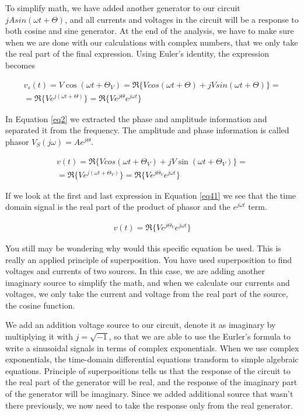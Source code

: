 \documentclass{ximera}
\begin{document}
To simplify math, we have added another generator to our circuit $j A sin (\omega t + \Theta)$, and all currents and voltages in the circuit will be a response to both cosine and sine generator. At the end of the analysis,  we have to make sure when we are done with our calculations with complex numbers, that we only take the real part of the final expression. Using
 Euler's identity, the expression becomes


\begin{eqnarray}
v_s(t)=  V \cos (\omega t + \Theta_V)=\Re\{ V cos (\omega t + \Theta ) + j V sin (\omega t + \Theta)\}= \nonumber \\ 
= \Re\{V e^{j(\omega t + \Theta)}\}=\Re\{V e^{j \Theta} e^{j \omega t}\} \label{eq2}
\end{eqnarray}

In Equation \ref{eq2}  we  extracted the phase and amplitude information
and separated it from the frequency. The amplitude and phase information is called phasor $V_S (j \omega)=A e^{j \Theta}$. 
 
\begin{eqnarray}
v(t)= \Re\{ V cos (\omega t + \Theta_V ) + j V \sin (\omega t + \Theta_V)\}= \nonumber \\ =\Re\{V e^{j(\omega t + \Theta_V)}\}=\Re\{V e^{j \Theta_V} e^{j \omega t}\} \label{eq41}
\end{eqnarray}

If we look at the first and last expression in Equation \ref{eq41} we see that the time domain signal is  the real part of the product of phasor and  the $e^{j \omega t}$ term. 

\begin{eqnarray}
v(t)=\Re\{V e^{j \Theta_V} e^{j \omega t}\} \label{eq41a} 
\end{eqnarray}



You still may be wondering why would this specific equation be used. This is really an applied principle of superposition. You have used superposition to find voltages and currents of two sources. In this case, we are adding another imaginary source to simplify the math, and when we calculate our currents and voltages, we only take the current and voltage from the real part of the source, the cosine function.

We add an addition voltage source to our circuit, denote it as imaginary by multiplying it with $j=\sqrt{-1}$, so that we are able to use the Eurler's formula to write a sinusoidal signals in terms of complex exponentials. When we use complex exponentials, the time-domain differential equations transform to simple algebraic equations. Principle of superpositions tells us that the response of the circuit to the real part of the generator will be real, and the response of the imaginary part of the generator will be imaginary. Since we added additional source that wasn't there previously, we now need to take the response only from the real generator.
\end{document}
